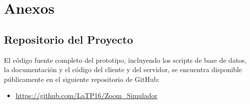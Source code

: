 \documentclass[12pt,a4paper]{article}
\begin{document}
\section{Anexos}

\subsection{Repositorio del Proyecto}
El c\'odigo fuente completo del prototipo, incluyendo los scripts de base de datos, la documentaci\'on y el c\'odigo del cliente y del servidor, se encuentra disponible p\'ublicamente en el siguiente repositorio de GitHub:
\begin{itemize}
    \item \url{https://github.com/LaTP16/Zoom_Simulador}
\end{itemize}
\end{document}
